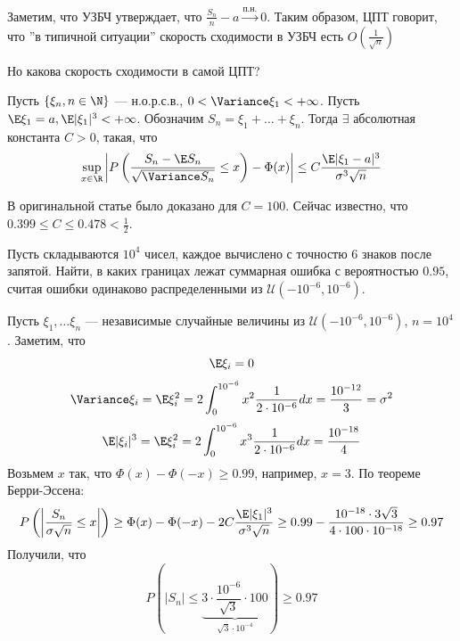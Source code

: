 \begin{note}
    Заметим, что УЗБЧ утверждает, что \(\frac{S_n}{n} - a \xrightarrow{\text{п.н.}} 0\). Таким образом, ЦПТ говорит, что ''в типичной ситуации'' скорость сходимости в УЗБЧ есть \(O\left( \frac{1}{\sqrt{n}} \right)\)
\end{note}

Но какова скорость сходимости в самой ЦПТ?

\begin{theorem}
    Пусть \(\{\xi_n, n \in \N\}\) --- н.о.р.с.в., \(0 < \Variance \xi_1 < +\infty\). Пусть \(\E\xi_1 = a, \E|\xi_1|^3 < +\infty\). Обозначим \(S_n = \xi_1 + \dots + \xi_n\). Тогда \(\exists \) абсолютная константа \(C > 0\), такая, что 
    \[\sup_{x \in \R}\left| P\left( \frac{S_n - \E S_n}{\sqrt{\Variance S_n}} \le x \right) - \Phi(x) \right| \le C \frac{\E|\xi_1 - a|^3}{\sigma^3 \sqrt{n}}\]
\end{theorem}

\begin{note}
    В оригинальной статье было доказано для \(C = 100\). Сейчас известно, что \(0.399 \le C \le 0.478 < \frac{1}{2}\).
\end{note}

\begin{example}
    Пусть складываются \(10^4\) чисел, каждое вычислено с точностю 6 знаков после запятой. Найти, в каких границах лежат суммарная ошибка с вероятностью \(0.95\), считая ошибки одинаково распределенными из \(\mathcal{U}(-10^{-6}, 10^{-6})\).
\end{example}
\begin{solution}
    Пусть \(\xi_1, \dots \xi_n\) --- независимые случайные величины из \(\mathcal{U}(-10^{-6}, 10^{-6})\), \(n = 10^4\). Заметим, что 
    \[\E\xi_i = 0\]
    \[\Variance \xi_i = \E\xi_i^2 = 2\int_0^{10^{-6}}x^2 \frac{1}{2\cdot 10^{-6}}dx = \frac{10^{-12}}{3} = \sigma^2\]
    \[\E |\xi_i|^3 = \E\xi_i^2 = 2\int_0^{10^{-6}}x^3 \frac{1}{2\cdot 10^{-6}}dx = \frac{10^{-18}}{4}\] 
    Возьмем \(x\) так, что \(\Phi(x) - \Phi(-x) \ge 0.99\), например, \(x = 3\). По теореме Берри-Эссена:
    \[P\left( \left| \frac{S_n}{\sigma \sqrt{n}} \le x \right| \right) \ge \Phi(x) - \Phi(-x) - 2C \frac{\E|\xi_1|^3}{\sigma^3 \sqrt{n}} \ge 0.99 - \frac{10^{-18}\cdot 3\sqrt{3}}{4\cdot 100 \cdot 10^{-18}} \ge 0.97\]
    Получили, что 
    \[P\left( |S_n| \le \underbrace{3\cdot\frac{10^{-6}}{\sqrt{3}}\cdot 100}_{\sqrt{3}\cdot 10^{-4}}\right) \ge 0.97\]
\end{solution}

